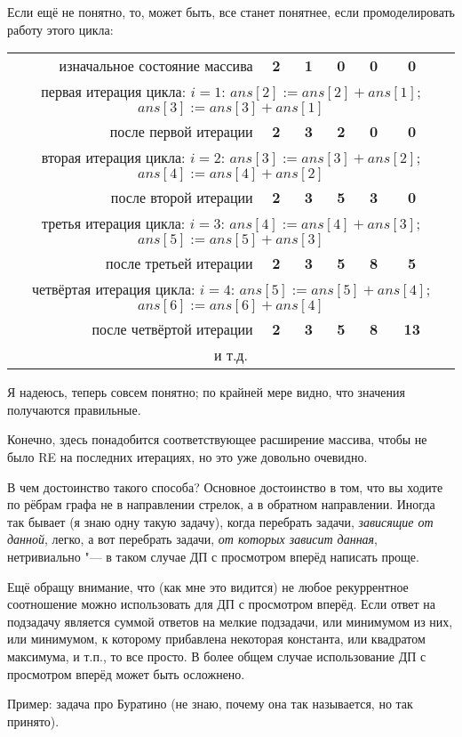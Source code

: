 Если ещё не понятно, то, может быть, все станет понятнее, если промоделировать работу этого цикла:
\begin{tabular}{r|>{\quad\bfseries}c>{\quad\bfseries}c>{\quad\bfseries}c>{\quad\bfseries}c>{\quad\bfseries}cc}
изначальное состояние массива&2 &1 &0 &0 &0\\
\multicolumn{7}{c}{первая итерация цикла: $i=1$: $ans[2]:=ans[2]+ans[1]$; $ans[3]:=ans[3]+ans[1]$}\\
после первой итерации&2 &3 &2 &0 &0\\
\multicolumn{7}{c}{вторая итерация цикла: $i=2$: $ans[3]:=ans[3]+ans[2]$; $ans[4]:=ans[4]+ans[2]$}\\
после второй итерации&2 &3 &5 &3 &0\\
\multicolumn{7}{c}{третья итерация цикла: $i=3$: $ans[4]:=ans[4]+ans[3]$; $ans[5]:=ans[5]+ans[3]$}\\
после третьей итерации&2 &3 &5 &8 &5\\
\multicolumn{7}{c}{четвёртая итерация цикла: $i=4$: $ans[5]:=ans[5]+ans[4]$; $ans[6]:=ans[6]+ans[4]$}\\
после четвёртой итерации&2 &3 &5 &8 &13\\
\multicolumn{7}{c}{и т.д.}\\
\end{tabular}

Я надеюсь, теперь совсем понятно; по крайней мере видно, что значения получаются правильные.

Конечно, здесь понадобится соответствующее расширение массива, чтобы не было RE на последних итерациях, но это уже довольно очевидно.

В чем достоинство такого способа? Основное достоинство в том, что вы ходите по рёбрам графа не в направлении стрелок, а в обратном направлении. Иногда так бывает (я знаю одну такую задачу), когда перебрать задачи, \textit{зависящие от данной}, легко, а вот перебрать задачи, \textit{от которых зависит данная}, нетривиально "--- в таком случае ДП с просмотром вперёд написать проще.

Ещё обращу внимание, что (как мне это видится) не любое рекуррентное соотношение можно использовать для ДП с просмотром вперёд. Если ответ на подзадачу является суммой ответов на мелкие подзадачи, или минимумом из них, или минимумом, к которому прибавлена некоторая константа, или квадратом максимума, и т.п., то все просто. В более общем случае использование ДП с просмотром вперёд может быть осложнено.

Пример: задача про Буратино (не знаю, почему она так называется, но так принято). 

